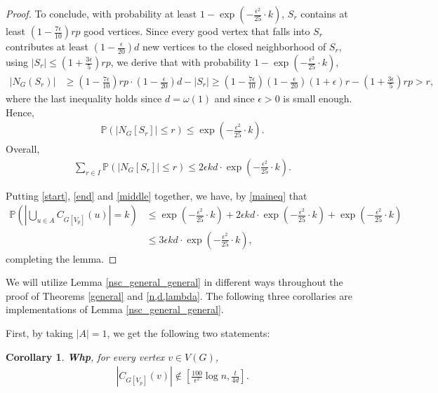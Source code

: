 \documentclass[notitlepage]{scrartcl}
\newtheorem{corollary}[thm]{Corollary}
\begin{document}
\begin{proof}
    To conclude, with probability at least $1-\exp\left(-\frac{\epsilon^2}{25}\cdot k\right)$, $S_r$ contains at least $\left(1-\frac{7\epsilon}{10}\right)rp$ good vertices. Since every good vertex that falls into $S_r$ contributes at least $\left(1-\frac{\epsilon}{20}\right)d$ new vertices to the closed neighborhood of $S_r$, using $|S_r|\le \left(1+\frac{3\epsilon}{5}\right)rp$, we derive that with probability $1-\exp\left(-\frac{\epsilon^2}{25}\cdot k\right)$,
    \begin{align*}
        |N_G(S_r)|&\ge \left(1-\frac{7\epsilon}{10}\right)rp\cdot \left(1-\frac{\epsilon}{20}\right)d-|S_r|\ge \left(1-\frac{7\epsilon}{10}\right)\left(1-\frac{\epsilon}{20}\right)(1+\epsilon)r-\left(1+\frac{3\epsilon}{5}\right)rp>r,
    \end{align*}
    where the last inequality holds since $d=\omega(1)$ and since $\epsilon>0$ is small enough.
    Hence, 
    \begin{align*}
        \mathbb{P}\left(|N_G[S_r]|\le r\right)\le \exp\left(-\frac{\epsilon^2}{25}\cdot k\right).
    \end{align*}
    Overall,
    \begin{align}\label{middle}
        \sum_{r\in I}\mathbb{P}\left(|N_G[S_r]|\le r\right)\le 2\epsilon kd\cdot \exp\left(-\frac{\epsilon^2}{25}\cdot k\right).
    \end{align}
    
    Putting \eqref{start}, \eqref{end} and \eqref{middle} together, we have, by \eqref{maineq} that 
    \begin{align*}
        \mathbb{P}\left(\left|\bigcup_{u\in A} C_{G[V_p]}(u)\right|=k\right)
        &\le \exp\left(-\frac{\epsilon^2}{25}\cdot k\right) + 2\epsilon kd\cdot \exp\left(-\frac{\epsilon^2}{25}\cdot k\right) + \exp\left(-\frac{\epsilon^2}{25}\cdot k\right)\\
        &\le 3\epsilon kd\cdot \exp\left(-\frac{\epsilon^2}{25}\cdot k\right),
    \end{align*}
    completing the lemma.
\end{proof}

We will utilize Lemma \ref{nsc_general_general} in different ways throughout the proof of Theorems \ref{general} and \ref{n,d,lambda}. The following three corollaries are implementations of Lemma \ref{nsc_general_general}.

First, by taking $|A|=1$, we get the following two statements:

\begin{corollary}\label{nsc_pre}
    \textbf{Whp}, for every vertex $v\in V(G)$, 
        \begin{align*}
            |C_{G[V_p]}(v)|\notin \left[\frac{100}{\epsilon^2}\log n, \frac{t}{4d}\right].
        \end{align*}
\end{corollary} 
\end{document}
